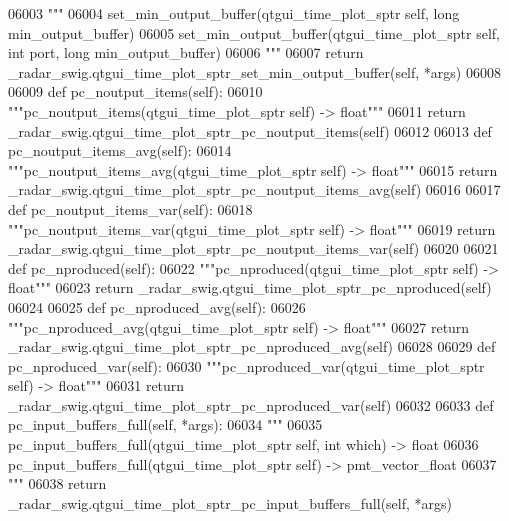 \begin{DoxyCode}
{{{{{{{{{{{{{{{{{{{{06003         \textcolor{stringliteral}{"""}
06004 \textcolor{stringliteral}{        set\_min\_output\_buffer(qtgui\_time\_plot\_sptr self, long min\_output\_buffer)}
06005 \textcolor{stringliteral}{        set\_min\_output\_buffer(qtgui\_time\_plot\_sptr self, int port, long min\_output\_buffer)}
06006 \textcolor{stringliteral}{        """}
06007         \textcolor{keywordflow}{return} \_radar\_swig.qtgui\_time\_plot\_sptr\_set\_min\_output\_buffer(self, *args)
06008 
06009     \textcolor{keyword}{def }pc_noutput_items(self):
06010         \textcolor{stringliteral}{"""pc\_noutput\_items(qtgui\_time\_plot\_sptr self) -> float"""}
06011         \textcolor{keywordflow}{return} \_radar\_swig.qtgui\_time\_plot\_sptr\_pc\_noutput\_items(self)
06012 
06013     \textcolor{keyword}{def }pc_noutput_items_avg(self):
06014         \textcolor{stringliteral}{"""pc\_noutput\_items\_avg(qtgui\_time\_plot\_sptr self) -> float"""}
06015         \textcolor{keywordflow}{return} \_radar\_swig.qtgui\_time\_plot\_sptr\_pc\_noutput\_items\_avg(self)
06016 
06017     \textcolor{keyword}{def }pc_noutput_items_var(self):
06018         \textcolor{stringliteral}{"""pc\_noutput\_items\_var(qtgui\_time\_plot\_sptr self) -> float"""}
06019         \textcolor{keywordflow}{return} \_radar\_swig.qtgui\_time\_plot\_sptr\_pc\_noutput\_items\_var(self)
06020 
06021     \textcolor{keyword}{def }pc_nproduced(self):
06022         \textcolor{stringliteral}{"""pc\_nproduced(qtgui\_time\_plot\_sptr self) -> float"""}
06023         \textcolor{keywordflow}{return} \_radar\_swig.qtgui\_time\_plot\_sptr\_pc\_nproduced(self)
06024 
06025     \textcolor{keyword}{def }pc_nproduced_avg(self):
06026         \textcolor{stringliteral}{"""pc\_nproduced\_avg(qtgui\_time\_plot\_sptr self) -> float"""}
06027         \textcolor{keywordflow}{return} \_radar\_swig.qtgui\_time\_plot\_sptr\_pc\_nproduced\_avg(self)
06028 
06029     \textcolor{keyword}{def }pc_nproduced_var(self):
06030         \textcolor{stringliteral}{"""pc\_nproduced\_var(qtgui\_time\_plot\_sptr self) -> float"""}
06031         \textcolor{keywordflow}{return} \_radar\_swig.qtgui\_time\_plot\_sptr\_pc\_nproduced\_var(self)
06032 
06033     \textcolor{keyword}{def }pc_input_buffers_full(self, *args):
06034         \textcolor{stringliteral}{"""}
06035 \textcolor{stringliteral}{        pc\_input\_buffers\_full(qtgui\_time\_plot\_sptr self, int which) -> float}
06036 \textcolor{stringliteral}{        pc\_input\_buffers\_full(qtgui\_time\_plot\_sptr self) -> pmt\_vector\_float}
06037 \textcolor{stringliteral}{        """}
06038         \textcolor{keywordflow}{return} \_radar\_swig.qtgui\_time\_plot\_sptr\_pc\_input\_buffers\_full(self, *args)
}}}}}}}}}}}}}}}}}}}}
\end{DoxyCode}
